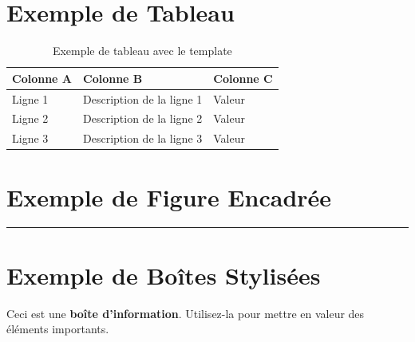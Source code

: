 \section{Exemple de Tableau}

\begin{table}[H]
\centering
\begin{tabularx}{0.9\textwidth}{L{3cm} X C{2.5cm}}
\toprule
\textbf{\color{primarycolor}Colonne A} &
\textbf{\color{primarycolor}Colonne B} &
\textbf{\color{primarycolor}Colonne C} \\
\midrule
Ligne 1 & Description de la ligne 1 & Valeur \\
\addlinespace[0.15cm]
Ligne 2 & Description de la ligne 2 & Valeur \\
\addlinespace[0.15cm]
Ligne 3 & Description de la ligne 3 & Valeur \\
\bottomrule
\end{tabularx}
\caption{Exemple de tableau avec le template}
\end{table}

\section{Exemple de Figure Encadrée}

\begin{borderedfigure}
    \centering
    \textcolor{primarycolor}{\rule{0.6\textwidth}{4cm}}  %
\end{borderedfigure}

\section{Exemple de Boîtes Stylisées}

\begin{infobox}
    \centering
    \vspace{0.3cm}
    {\large Ceci est une \textbf{boîte d'information}. Utilisez-la pour
    mettre en valeur des éléments importants.}
    \vspace{0.3cm}
\end{infobox}

